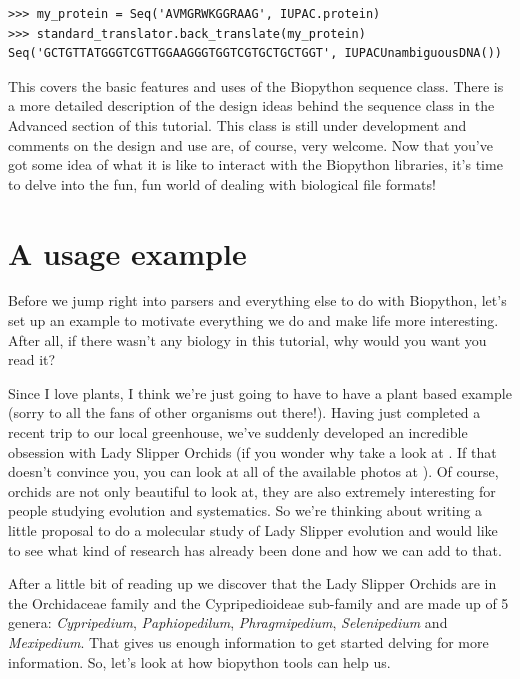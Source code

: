 \documentclass{report}
\begin{document}
\begin{verbatim}
>>> my_protein = Seq('AVMGRWKGGRAAG', IUPAC.protein)
>>> standard_translator.back_translate(my_protein)
Seq('GCTGTTATGGGTCGTTGGAAGGGTGGTCGTGCTGCTGGT', IUPACUnambiguousDNA())
\end{verbatim}

This covers the basic features and uses of the Biopython sequence class. There is a more detailed description of the design ideas behind the sequence class in the Advanced section of this tutorial. This class is still under development and comments on the design and use are, of course, very welcome. Now that you've got some idea of what it is like to interact with the Biopython libraries, it's time to delve into the fun, fun world of dealing with biological file formats!

\section{A usage example}
\label{sec:orchids}

Before we jump right into parsers and everything else to do with Biopython, let's set up an example to motivate everything we do and make life more interesting. After all, if there wasn't any biology in this tutorial, why would you want you read it?


Since I love plants, I think we're just going to have to have a plant based example (sorry to all the fans of other organisms out there!).  Having just completed a recent trip to our local greenhouse, we've suddenly developed an incredible obsession with Lady Slipper Orchids (if you wonder why take a look at . If that doesn't convince you, you can look at all of the available photos at  ).  Of course, orchids are not only beautiful to look at, they are also extremely interesting for people studying evolution and systematics. So we're thinking about writing a little proposal to do a molecular study of Lady Slipper evolution and would like to see what kind of research has already been done and how we can add to that.


After a little bit of reading up we discover that the Lady Slipper Orchids are in the Orchidaceae family and the Cypripedioideae sub-family and are made up of 5 genera:  \emph{Cypripedium}, \emph{Paphiopedilum}, \emph{Phragmipedium}, \emph{Selenipedium} and \emph{Mexipedium}. That gives us enough information to get started delving for more information. So, let's look at how biopython tools can help us.
\end{document}
